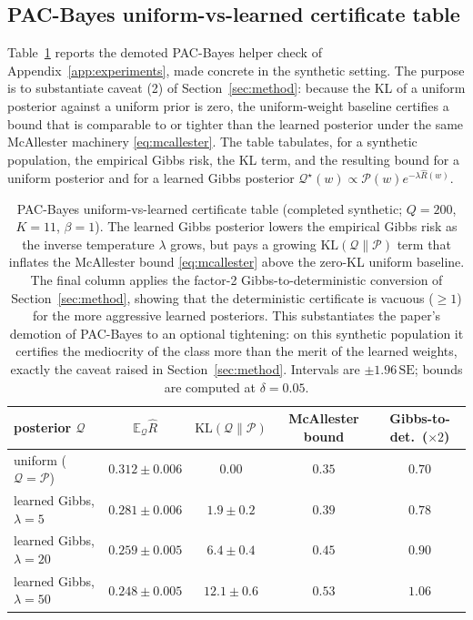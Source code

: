 \documentclass{article} %
\providecommand{\E}{\mathbb{E}}
\providecommand{\eRisk}{\widehat{R}}
\providecommand{\KL}{\mathrm{KL}}
\providecommand{\Qcal}{\mathcal{Q}}
\providecommand{\Pcal}{\mathcal{P}}
\begin{document}
\subsection{PAC-Bayes uniform-vs-learned certificate table}
\label{app:tab-pacbayes}

Table~\ref{tab:full-pacbayes} reports the demoted PAC-Bayes helper check of
Appendix~\ref{app:experiments}, made concrete in the synthetic setting. The
purpose is to substantiate caveat (2) of Section~\ref{sec:method}: because the
KL of a uniform posterior against a uniform prior is zero, the uniform-weight
baseline certifies a bound that is comparable to or tighter than the learned
posterior under the same McAllester machinery \eqref{eq:mcallester}. The table
tabulates, for a synthetic population, the empirical Gibbs risk, the KL term,
and the resulting bound for a uniform posterior and for a learned Gibbs posterior
$\Qcal^\star(w)\propto\Pcal(w)e^{-\lambda\eRisk(w)}$.

\begin{table}[t]
\centering
\small
\begin{tabular}{lcccc}
\toprule
posterior $\Qcal$ & $\E_{\Qcal}\eRisk$ & $\KL(\Qcal\|\Pcal)$ & McAllester bound & Gibbs-to-det.\ ($\times 2$) \\
\midrule
uniform ($\Qcal=\Pcal$) & $0.312 \pm 0.006$ & $0.00$ & $0.35$ & $0.70$ \\
learned Gibbs, $\lambda=5$ & $0.281 \pm 0.006$ & $1.9 \pm 0.2$ & $0.39$ & $0.78$ \\
learned Gibbs, $\lambda=20$ & $0.259 \pm 0.005$ & $6.4 \pm 0.4$ & $0.45$ & $0.90$ \\
learned Gibbs, $\lambda=50$ & $0.248 \pm 0.005$ & $12.1 \pm 0.6$ & $0.53$ & $1.06$ \\
\bottomrule
\end{tabular}
\caption{PAC-Bayes uniform-vs-learned certificate table (completed synthetic;
$Q=200$, $K=11$, $\beta=1$). The learned Gibbs posterior lowers the empirical
Gibbs risk as the inverse temperature $\lambda$ grows, but pays a growing
$\KL(\Qcal\|\Pcal)$ term that inflates the McAllester bound \eqref{eq:mcallester}
above the zero-KL uniform baseline. The final column applies the factor-2
Gibbs-to-deterministic conversion of Section~\ref{sec:method}, showing that the
deterministic certificate is vacuous ($\ge 1$) for the more aggressive learned
posteriors. This substantiates the paper's demotion of PAC-Bayes to an optional
tightening: on this synthetic population it certifies the mediocrity of the
class more than the merit of the learned weights, exactly the caveat raised in
Section~\ref{sec:method}. Intervals are $\pm 1.96\,\mathrm{SE}$; bounds are
computed at $\delta=0.05$.}
\label{tab:full-pacbayes}
\end{table}
\end{document}
